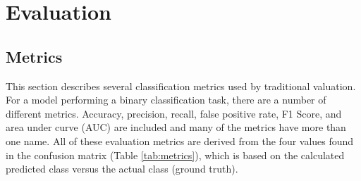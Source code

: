 \documentclass[conference]{IEEEtran}
\begin{document}
%


\section{Evaluation}

\subsection{Metrics}

This section describes several classification metrics used by traditional valuation. For a model performing a binary classification task, there are a number of different metrics. Accuracy, precision, recall, false positive rate, F1 Score, and area under curve (AUC) are included and many of the metrics have more than one name. All of these evaluation metrics are derived from the four values found in the confusion matrix (Table \ref{tab:metrics}), which is based on the calculated predicted class versus the actual class (ground truth).
\end{document}
